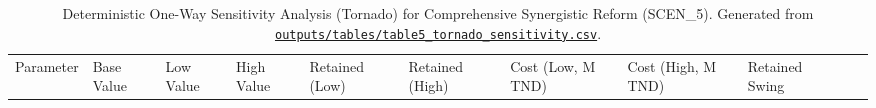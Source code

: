 \documentclass[
  11pt,
  a4paper]{article}
\begin{document}
\begin{longtable}[]{@{}
  >{\raggedright\arraybackslash}p{}
  >{\centering\arraybackslash}p{}
  >{\centering\arraybackslash}p{}
  >{\centering\arraybackslash}p{}
  >{\centering\arraybackslash}p{}
  >{\centering\arraybackslash}p{}
  >{\centering\arraybackslash}p{}
  >{\centering\arraybackslash}p{}
  >{\centering\arraybackslash}p{}
  >{\centering\arraybackslash}p{}
  >{\centering\arraybackslash}p{}@{}}
\caption{Deterministic One-Way Sensitivity Analysis (Tornado) for
Comprehensive Synergistic Reform (SCEN\_5). Generated from
\href{file:///c:/Users/drfir/Documents/physician-exodus-tunisia/outputs/tables/table5_tornado_sensitivity.csv}{\protect\texttt{outputs/tables/table5\_tornado\_sensitivity.csv}}.}\label{tbl-tornado}\tabularnewline
\toprule\noalign{}
\begin{minipage}[b]{\linewidth}\raggedright
Parameter
\end{minipage} & \begin{minipage}[b]{\linewidth}\centering
Base Value
\end{minipage} & \begin{minipage}[b]{\linewidth}\centering
Low Value
\end{minipage} & \begin{minipage}[b]{\linewidth}\centering
High Value
\end{minipage} & \begin{minipage}[b]{\linewidth}\centering
Retained (Low)
\end{minipage} & \begin{minipage}[b]{\linewidth}\centering
Retained (High)
\end{minipage} & \begin{minipage}[b]{\linewidth}\centering
Cost (Low, M TND)
\end{minipage} & \begin{minipage}[b]{\linewidth}\centering
Cost (High, M TND)
\end{minipage} & \begin{minipage}[b]{\linewidth}\centering
Retained Swing
\end{minipage} & \begin{minipage}[b]{\linewidth}\centering

\end{minipage}
\end{longtable}
\end{document}
